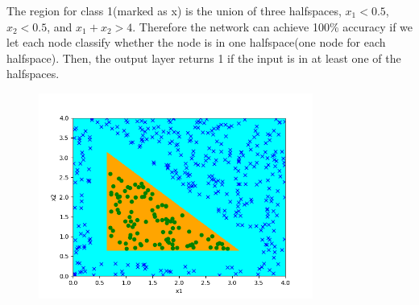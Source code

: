 \begin{answer}
The region for class 1(marked as x) is the union of three halfspaces, $x_1<0.5$, $x_2<0.5$, and $x_1+x_2>4$. Therefore the network can achieve 100\% accuracy if we let each node classify whether the node is in one halfspace(one node for each halfspace). Then, the output layer returns 1 if the input is in at least one of the halfspaces.
\begin{figure}[H]
    \centering
    \includegraphics[width=9cm]{simple_nn/step_weights.png}
\end{figure}
\end{answer}
